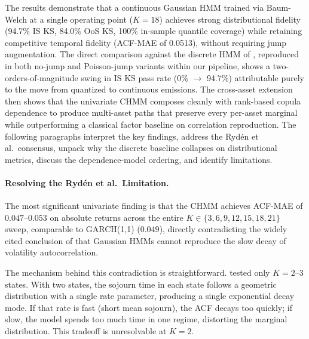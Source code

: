 The results demonstrate that a continuous Gaussian HMM trained via Baum-Welch at a single operating point ($K = 18$) achieves strong distributional fidelity (94.7\% IS KS, 84.0\% OoS KS, 100\% in-sample quantile coverage) while retaining competitive temporal fidelity (ACF-MAE of 0.0513), without requiring jump augmentation.
The direct comparison against the discrete HMM of \citet{alswaidan2026hybrid}, reproduced in both no-jump and Poisson-jump variants within our pipeline, shows a two-orders-of-magnitude swing in IS KS pass rate (0\% $\to$ 94.7\%) attributable purely to the move from quantized to continuous emissions.
The cross-asset extension then shows that the univariate CHMM composes cleanly with rank-based copula dependence to produce multi-asset paths that preserve every per-asset marginal while outperforming a classical factor baseline on correlation reproduction.
The following paragraphs interpret the key findings, address the Ryd\'{e}n et al.\ consensus, unpack why the discrete baseline collapses on distributional metrics, discuss the dependence-model ordering, and identify limitations.

\paragraph{Resolving the Ryd\'{e}n et al.\ Limitation.}
The most significant univariate finding is that the CHMM achieves ACF-MAE of $0.047$--$0.053$ on absolute returns across the entire $K \in \{3, 6, 9, 12, 15, 18, 21\}$ sweep, comparable to GARCH(1,1) ($0.049$), directly contradicting the widely cited conclusion of \citet{ryden1998stylized} that Gaussian HMMs cannot reproduce the slow decay of volatility autocorrelation.

The mechanism behind this contradiction is straightforward.
\citet{ryden1998stylized} tested only $K = 2$--$3$ states.
With two states, the sojourn time in each state follows a geometric distribution with a single rate parameter, producing a single exponential decay mode.
If that rate is fast (short mean sojourn), the ACF decays too quickly; if slow, the model spends too much time in one regime, distorting the marginal distribution.
This tradeoff is unresolvable at $K = 2$.

